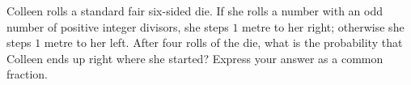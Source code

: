 Colleen rolls a standard fair six-sided die. If she rolls a number with an odd number of positive integer divisors, she steps $1$ metre to her right; otherwise she steps $1$ metre to her left. After four rolls of the die, what is the probability that Colleen ends up right where she started? Express your answer as a common fraction.
